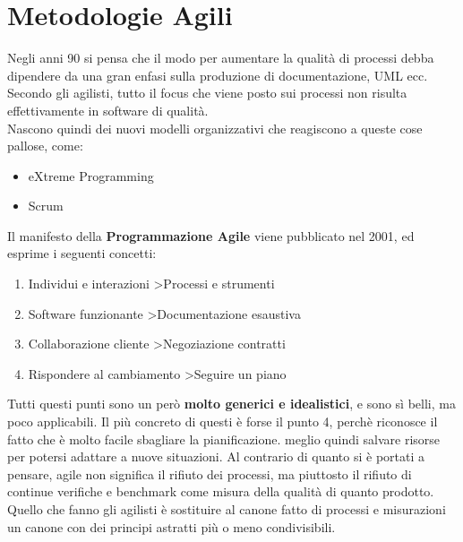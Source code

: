\documentclass[a4paper,12pt]{article}
\begin{document}
\section{Metodologie Agili}
Negli anni 90 si pensa che il modo per aumentare la qualità di processi debba dipendere da una gran enfasi sulla produzione di documentazione, UML ecc. Secondo gli agilisti, tutto il focus che viene posto sui processi non risulta effettivamente in software di qualità.\\ Nascono quindi dei nuovi modelli organizzativi che reagiscono a queste cose pallose, come:
\begin{itemize}
\item eXtreme Programming
\item Scrum
\end{itemize}
Il manifesto della \textbf{Programmazione Agile} viene pubblicato nel 2001, ed esprime i seguenti concetti:
\begin{enumerate}
\item Individui e interazioni \textgreater\space Processi e strumenti
\item Software funzionante \textgreater\space Documentazione esaustiva
\item Collaborazione cliente \textgreater\space Negoziazione contratti
\item Rispondere al cambiamento \textgreater\space Seguire un piano
\end{enumerate}
Tutti questi punti sono un però \textbf{molto generici e idealistici}, e sono sì belli, ma poco applicabili. Il più concreto di questi è forse il punto 4, perchè riconosce il fatto che è molto facile sbagliare la pianificazione. \E meglio quindi salvare risorse per potersi adattare a nuove situazioni.
\vspace{0.5cm}
\noindent Al contrario di quanto si è portati a pensare, agile non significa il rifiuto dei processi, ma piuttosto il rifiuto di continue verifiche e benchmark come misura della qualità di quanto prodotto. Quello che fanno gli agilisti è sostituire al canone fatto di processi e misurazioni un canone con dei principi astratti più o meno condivisibili.
\end{document}

